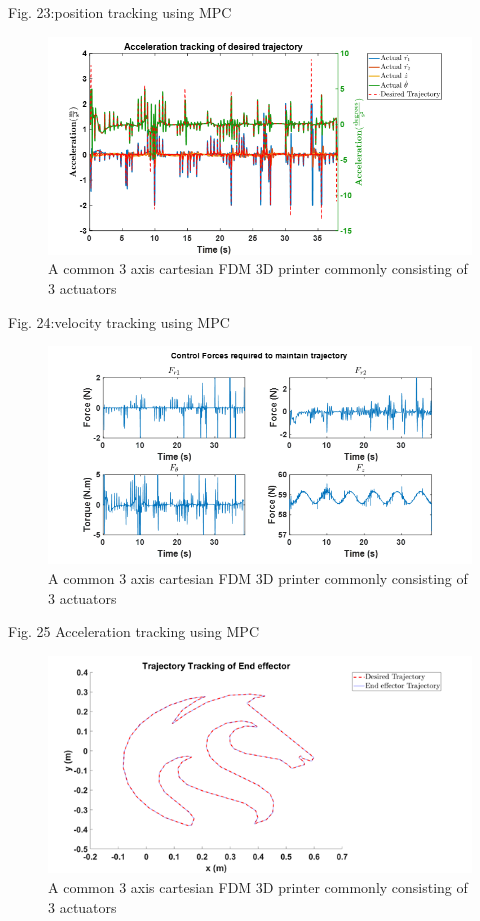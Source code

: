 \documentclass{UoNMCHA}
\numberwithin{equation}{section}
\begin{document}
	Fig. 23:position tracking using MPC
	
	\begin{figure}[H]
		\begin{center}
			\includegraphics[width=.8\linewidth]{figs/Picture35}
			\caption{A  common 3 axis cartesian FDM 3D printer commonly consisting of 3 actuators}
			\label{figs/Picture35}
		\end{center}
	\end{figure}
	
	Fig. 24:velocity tracking using MPC
	
	\begin{figure}[H]
		\begin{center}
			\includegraphics[width=.8\linewidth]{figs/Picture36}
			\caption{A  common 3 axis cartesian FDM 3D printer commonly consisting of 3 actuators}
			\label{figs/Picture36}
		\end{center}
	\end{figure}
	
	Fig. 25 Acceleration tracking using MPC
	
	\begin{figure}[H]
		\begin{center}
			\includegraphics[width=.8\linewidth]{figs/Picture391}
			\caption{A  common 3 axis cartesian FDM 3D printer commonly consisting of 3 actuators}
			\label{figs/Picture381}
		\end{center}
	\end{figure}
	
\end{document}
